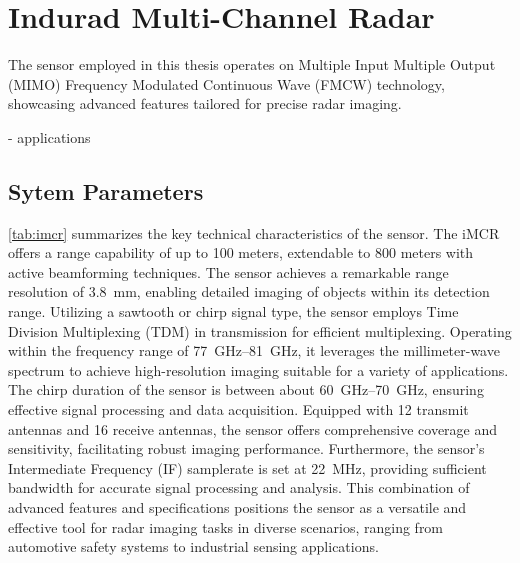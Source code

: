 \section{Indurad Multi-Channel Radar}
\label{sec:imcr}
The sensor employed in this thesis operates on Multiple Input Multiple Output (MIMO) Frequency Modulated Continuous Wave (FMCW) technology,
showcasing advanced features tailored for precise radar imaging.

- applications

\subsection{Sytem Parameters}

\cref{tab:imcr} summarizes the key technical characteristics of the sensor.
The iMCR offers a range capability of up to 100 meters, extendable to 800 meters with active beamforming techniques.
The sensor achieves a remarkable range resolution of \SI{3.8}{\mm}, enabling detailed imaging of objects within its detection range.
Utilizing a sawtooth or chirp signal type, the sensor employs Time Division Multiplexing (TDM) in transmission for efficient multiplexing.
Operating within the frequency range of \SIrange{77}{81}{\GHz},
it leverages the millimeter-wave spectrum to achieve high-resolution imaging suitable for a variety of applications.
The chirp duration of the sensor is between about \SIrange{60}{70}{\GHz}, ensuring effective signal processing and data acquisition.
Equipped with 12 transmit antennas and 16 receive antennas, the sensor offers comprehensive coverage and sensitivity,
facilitating robust imaging performance.
Furthermore, the sensor's Intermediate Frequency (IF) samplerate is set at \SI{22}{\MHz},
providing sufficient bandwidth for accurate signal processing and analysis.
This combination of advanced features and specifications positions the sensor as a versatile and effective tool for radar imaging tasks in diverse scenarios,
ranging from automotive safety systems to industrial sensing applications. \\

